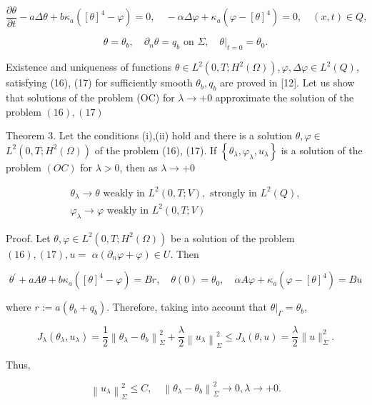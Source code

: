 $$
\frac{\partial \theta}{\partial t}-a \Delta \theta+b \kappa_{a}\left([\theta]^{4}-\varphi\right)=0, \quad-\alpha \Delta \varphi+\kappa_{a}\left(\varphi-[\theta]^{4}\right)=0, \quad(x, t) \in Q,
$$

$$
\theta=\theta_{b}, \quad \partial_{n} \theta=q_{b} \text { on } \Sigma,\left.\quad \theta\right|_{t=0}=\theta_{0} .
$$

Existence and uniqueness of functions $\theta \in L^{2}\left(0, T ; H^{2}(\Omega)\right), \varphi, \Delta \varphi \in L^{2}(Q)$, satisfying (16), (17) for sufficiently smooth $\theta_{b}, q_{b}$ are proved in [12]. Let us show that solutions of the problem (OC) for $\lambda \rightarrow+0$ approximate the solution of the problem $(16),(17)$

Theorem 3. Let the conditions (i),(ii) hold and there is a solution $\theta, \varphi \in$ $L^{2}\left(0, T ; H^{2}(\Omega)\right)$ of the problem (16), (17). If $\left\{\theta_{\lambda}, \varphi_{\lambda}, u_{\lambda}\right\}$ is a solution of the problem $(O C)$ for $\lambda>0$, then as $\lambda \rightarrow+0$

$$
\begin{gathered}
\theta_{\lambda} \rightarrow \theta \text { weakly in } L^{2}(0, T ; V), \text { strongly in } L^{2}(Q), \\
\varphi_{\lambda} \rightarrow \varphi \text { weakly in } L^{2}(0, T ; V)
\end{gathered}
$$

Proof. Let $\theta, \varphi \in L^{2}\left(0, T ; H^{2}(\Omega)\right)$ be a solution of the problem $(16),(17), u=$ $\alpha\left(\partial_{n} \varphi+\varphi\right) \in U$. Then

$$
\theta^{\prime}+a A \theta+b \kappa_{a}\left([\theta]^{4}-\varphi\right)=B r, \quad \theta(0)=\theta_{0}, \quad \alpha A \varphi+\kappa_{a}\left(\varphi-[\theta]^{4}\right)=B u
$$

where $r:=a\left(\theta_{b}+q_{b}\right)$. Therefore, taking into account that $\left.\theta\right|_{\Gamma}=\theta_{b}$,

$$
J_{\lambda}\left(\theta_{\lambda}, u_{\lambda}\right)=\frac{1}{2}\left\|\theta_{\lambda}-\theta_{b}\right\|_{\Sigma}^{2}+\frac{\lambda}{2}\left\|u_{\lambda}\right\|_{\Sigma}^{2} \leq J_{\lambda}(\theta, u)=\frac{\lambda}{2}\|u\|_{\Sigma}^{2} .
$$

Thus,

$$
\left\|u_{\lambda}\right\|_{\Sigma}^{2} \leq C, \quad\left\|\theta_{\lambda}-\theta_{b}\right\|_{\Sigma}^{2} \rightarrow 0, \lambda \rightarrow+0 .
$$

